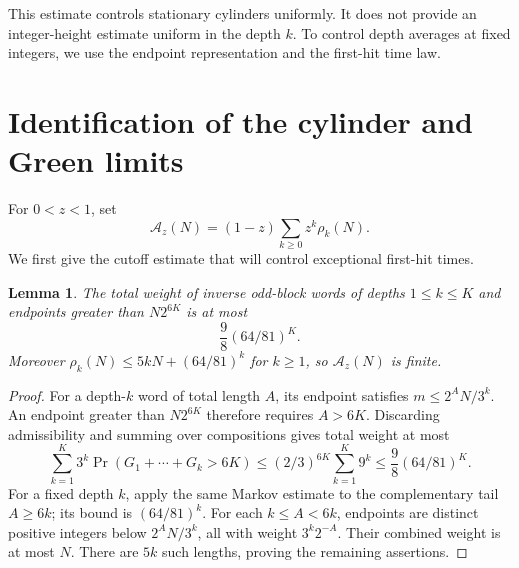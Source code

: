 \documentclass[11pt,a4paper]{article}
\newtheorem{lemma}[theorem]{Lemma}
\begin{document}
This estimate controls stationary cylinders uniformly. It does not
provide an integer-height estimate uniform in the depth \(k\).
To control depth averages at fixed integers, we use the endpoint
representation and the first-hit time law.

\section{Identification of the cylinder and Green limits}

For \(0<z<1\), set
\[
 \mathcal A_z(N)=(1-z)\sum_{k\ge0}z^k\rho_k(N).
\]
We first give the cutoff estimate that will control exceptional
first-hit times.

\begin{lemma}\label{lem:ct-endpoint-tail}
The total weight of inverse odd-block words of depths
\(1\le k\le K\) and endpoints greater than \(N2^{6K}\) is at most
\begin{equation}\label{eq:ct-endpoint-tail}
 \frac98(64/81)^K.
\end{equation}
Moreover \(\rho_k(N)\le5kN+(64/81)^k\) for \(k\ge1\), so
\(\mathcal A_z(N)\) is finite.
\end{lemma}
\begin{proof}
For a depth-\(k\) word of total length \(A\), its endpoint
satisfies \(m\le2^AN/3^k\). An endpoint greater than \(N2^{6K}\)
therefore requires \(A>6K\). Discarding admissibility and summing
over compositions gives total weight at most
\[
 \sum_{k=1}^K3^k\Pr(G_1+\cdots+G_k>6K)
 \le(2/3)^{6K}\sum_{k=1}^K9^k
 \le\frac98(64/81)^K.
\]
For a fixed depth \(k\), apply the same Markov estimate to
the complementary tail \(A\ge6k\); its bound is
\((64/81)^k\). For each
\(k\le A<6k\), endpoints are distinct positive integers below
\(2^AN/3^k\), all with weight \(3^k2^{-A}\). Their combined
weight is at most \(N\). There are \(5k\) such lengths, proving
the remaining assertions.
\end{proof}
\end{document}
